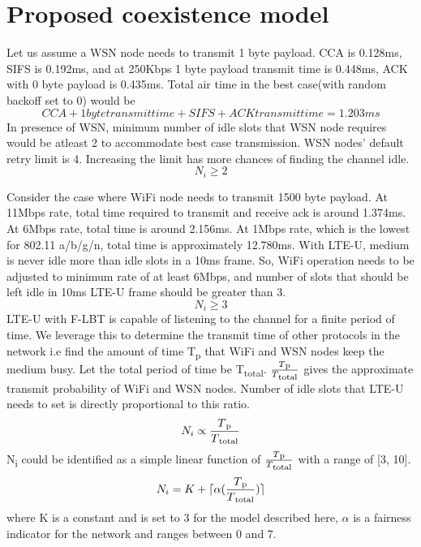 \documentclass[a4paper]{article}
\DeclarePairedDelimiter{\ceil}{\lceil}{\rceil}
\begin{document}
\section{Proposed coexistence model}
Let us assume a {WSN} node needs to transmit 1 byte payload. {CCA} is 0.128ms, {SIFS} is 0.192ms, and at 250Kbps 1 byte payload transmit time is 0.448ms, ACK with 0 byte payload is 0.435ms.
Total air time in the best case(with random backoff set to 0) would be 
\begin{equation}
{CCA + 1 byte transmit time + SIFS + ACK transmit time} = 1.203ms
\end{equation}
In presence of {WSN}, minimum number of idle slots that {WSN} node requires would be atleast 2 to accommodate best case transmission.
{WSN} nodes' default retry limit is 4. Increasing the limit has more chances of finding the channel idle.
\begin{equation}
					N_{i} \geq 2 \label{rule 1}
\end{equation}

Consider the case where {WiFi} node needs to transmit 1500 byte payload. At 11Mbps rate, total time required to transmit and receive ack is around 1.374ms. At 6Mbps rate, total time is around 2.156ms. At 1Mbps rate, which is the lowest for {802.11 a/b/g/n}, total time is approximately 12.780ms. With {LTE-U}, medium is never idle more than idle slots in a 10ms frame.
So, {WiFi} operation needs to be adjusted to minimum rate of at least 6Mbps, and number of slots that should be left idle in 10ms {LTE-U} frame should be greater than 3.
\begin{equation}
					N_{i} \geq 3 \label{rule 2}
\end{equation}
{LTE-U} with {F-LBT} is capable of listening to the channel for a finite period of time. We leverage this to determine the transmit time of other protocols in the network i.e find the amount of time {T\textsubscript{p}} that {WiFi} and {WSN} nodes keep the medium busy. Let the total period of time be {T\textsubscript{total}}. $\frac{T\textsubscript{p}}{T\textsubscript{total}}$ gives the approximate transmit probability of {WiFi} and {WSN} nodes. Number of idle slots that {LTE-U} needs to set is directly proportional to this ratio.
\begin{equation}
					N_{i} \propto \frac{T\textsubscript{p}}{T\textsubscript{total}}
\end{equation}
N\textsubscript{i} could be identified as a simple linear function of $\frac{T\textsubscript{p}}{T\textsubscript{total}}$ with a range of [3, 10].
\begin{equation}
					N_{i} = K + \ceil{\alpha(\frac{T\textsubscript{p}}{T\textsubscript{total}})}
\end{equation}
where {K} is a constant and is set to 3 for the model described here, $\alpha$ is a fairness indicator for the network and ranges between 0 and 7.
\end{document}
